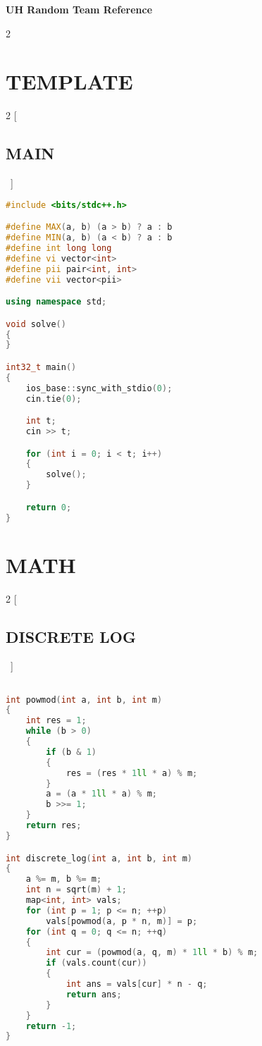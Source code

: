 \documentclass[leter]{amsart}
\begin{document}
\begin{center} \textbf{ UH Random Team Reference } \end{center} \vspace*{50pt} %

\begin{multicols}{2} \tableofcontents \end{multicols}

\enlargethispage*{\baselineskip} \pagebreak

\section{TEMPLATE}
\begin{multicols}{2}
[\subsection{MAIN}\ ]
\begin{lstlisting}[language=C++]
#include <bits/stdc++.h>

#define MAX(a, b) (a > b) ? a : b
#define MIN(a, b) (a < b) ? a : b
#define int long long
#define vi vector<int>
#define pii pair<int, int>
#define vii vector<pii>

using namespace std;

void solve()
{
}

int32_t main()
{
    ios_base::sync_with_stdio(0);
    cin.tie(0);

    int t;
    cin >> t;

    for (int i = 0; i < t; i++)
    {
        solve();
    }

    return 0;
}

\end{lstlisting}
\end{multicols}
\enlargethispage*{\baselineskip}\section{MATH}
\begin{multicols}{2}
[\subsection{DISCRETE LOG}\ ]
\begin{lstlisting}[language=C++]

int powmod(int a, int b, int m)
{
    int res = 1;
    while (b > 0)
    {
        if (b & 1)
        {
            res = (res * 1ll * a) % m;
        }
        a = (a * 1ll * a) % m;
        b >>= 1;
    }
    return res;
}

int discrete_log(int a, int b, int m)
{
    a %= m, b %= m;
    int n = sqrt(m) + 1;
    map<int, int> vals;
    for (int p = 1; p <= n; ++p)
        vals[powmod(a, p * n, m)] = p;
    for (int q = 0; q <= n; ++q)
    {
        int cur = (powmod(a, q, m) * 1ll * b) % m;
        if (vals.count(cur))
        {
            int ans = vals[cur] * n - q;
            return ans;
        }
    }
    return -1;
}


\end{lstlisting}
\end{multicols}
\end{document}
